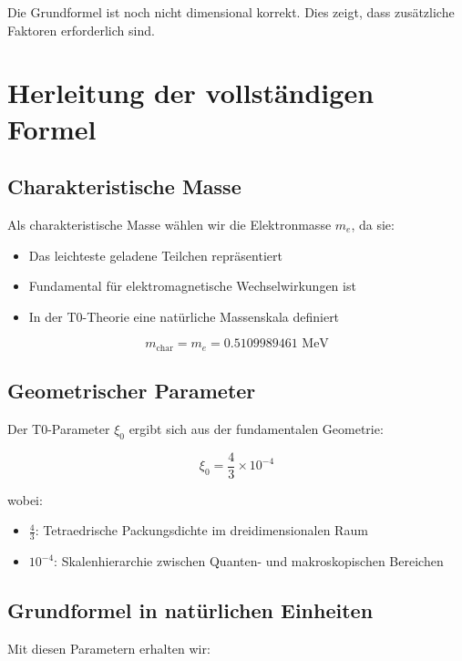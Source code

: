 \documentclass[12pt,a4paper]{article}
\begin{document}
	Die Grundformel ist noch nicht dimensional korrekt. Dies zeigt, dass zusätzliche Faktoren erforderlich sind.
	
	\section{Herleitung der vollständigen Formel}
	
	\subsection{Charakteristische Masse}
	
	Als charakteristische Masse wählen wir die Elektronmasse $m_e$, da sie:
	\begin{itemize}
		\item Das leichteste geladene Teilchen repräsentiert
		\item Fundamental für elektromagnetische Wechselwirkungen ist
		\item In der T0-Theorie eine natürliche Massenskala definiert
	\end{itemize}
	
	\begin{equation}
		m_{\text{char}} = m_e = 0.5109989461 \text{ MeV}
	\end{equation}
	
	\subsection{Geometrischer Parameter}
	
	Der T0-Parameter $\xi_0$ ergibt sich aus der fundamentalen Geometrie:
	
	\begin{equation}
		\xi_0 = \frac{4}{3} \times 10^{-4}
	\end{equation}
	
	wobei:
	\begin{itemize}
		\item $\frac{4}{3}$: Tetraedrische Packungsdichte im dreidimensionalen Raum
		\item $10^{-4}$: Skalenhierarchie zwischen Quanten- und makroskopischen Bereichen
	\end{itemize}
	
	\subsection{Grundformel in natürlichen Einheiten}
	
	Mit diesen Parametern erhalten wir:
	
\end{document}
